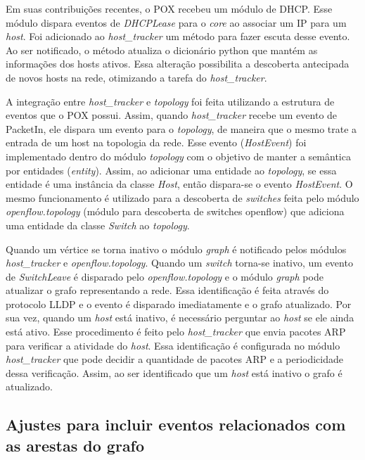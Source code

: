 Em suas contribuições recentes, o POX recebeu um módulo de DHCP. 
Esse módulo dispara eventos de \emph{DHCPLease} para o \emph{core} 
ao associar um IP para um \emph{host}.
Foi adicionado ao \emph{host\_tracker} um método para fazer escuta desse evento. 
Ao ser notificado, 
o método atualiza o dicionário python que mantém as informações dos hosts ativos. 
Essa alteração possibilita a descoberta antecipada de novos hosts na rede, 
otimizando a tarefa do \emph{host\_tracker}.

A integração entre \emph{host\_tracker} e \emph{topology} 
foi feita utilizando a estrutura de eventos que o POX possui. 
Assim, quando \emph{host\_tracker} recebe um evento de PacketIn, 
ele dispara um evento para o \emph{topology}, 
de maneira que o mesmo trate a entrada de um host na topologia da rede.
Esse evento (\emph{HostEvent}) foi implementado dentro do módulo \emph{topology} 
com o objetivo de manter a semântica por entidades (\emph{entity}). 
Assim, ao adicionar uma entidade ao \emph{topology}, se essa entidade é uma 
instância da classe \emph{Host}, então dispara-se o evento \emph{HostEvent}. 
O mesmo funcionamento é utilizado para a descoberta de \emph{switches} feita pelo
módulo \emph{openflow.topology} (módulo para descoberta de switches openflow)
que adiciona uma entidade da classe \emph{Switch} ao \emph{topology}.

Quando um vértice se torna inativo o módulo \emph{graph} é notificado
pelos módulos \emph{host\_tracker} e \emph{openflow.topology}.
Quando um \emph{switch} torna-se inativo, um evento de 
\emph{SwitchLeave} é disparado pelo \emph{openflow.topology} e o
módulo \emph{graph} pode atualizar o grafo representando a rede.
Essa identificação é feita através do protocolo LLDP e o evento 
é disparado imediatamente e o grafo atualizado.
Por sua vez, quando um \emph{host} está inativo, é necessário 
perguntar ao \emph{host} se ele ainda está ativo. 
Esse procedimento é feito pelo \emph{host\_tracker} que envia 
pacotes ARP para verificar a atividade do \emph{host}. 
Essa identificação é configurada no módulo \emph{host\_tracker}
que pode decidir a quantidade de pacotes ARP e a periodicidade 
dessa verificação. 
Assim, ao ser identificado que um \emph{host} está inativo 
o grafo é atualizado.

\subsection{Ajustes para incluir eventos relacionados com as arestas do grafo}

